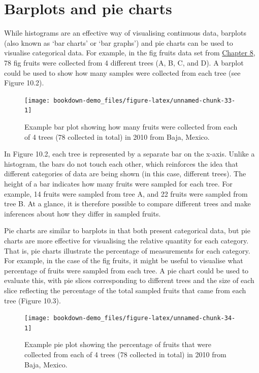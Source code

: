 \documentclass[
  openany]{krantz}
\begin{document}
\hypertarget{barplots-and-pie-charts}{%
\section{Barplots and pie charts}\label{barplots-and-pie-charts}}

While histograms are an effective way of visualising continuous data, barplots (also known as `bar charts' or `bar graphs') and pie charts can be used to visualise categorical data.
For example, in the fig fruits data set from \protect\hyperlink{Chapter_8}{Chapter 8}, 78 fig fruits were collected from 4 different trees (A, B, C, and D).
A barplot could be used to show how many samples were collected from each tree (see Figure 10.2).

\begin{figure}
\texttt{[image: bookdown-demo\_files/figure-latex/unnamed-chunk-33-1]} \caption{Example bar plot showing how many fruits were collected from each of 4 trees (78 collected in total) in 2010 from Baja, Mexico.}\label{fig:unnamed-chunk-33}
\end{figure}

In Figure 10.2, each tree is represented by a separate bar on the x-axis.
Unlike a histogram, the bars do not touch each other, which reinforces the idea that different categories of data are being shown (in this case, different trees).
The height of a bar indicates how many fruits were sampled for each tree.
For example, 14 fruits were sampled from tree A, and 22 fruits were sampled from tree B.
At a glance, it is therefore possible to compare different trees and make inferences about how they differ in sampled fruits.

Pie charts are similar to barplots in that both present categorical data, but pie charts are more effective for visualising the relative quantity for each category.
That is, pie charts illustrate the percentage of measurements for each category.
For example, in the case of the fig fruits, it might be useful to visualise what percentage of fruits were sampled from each tree.
A pie chart could be used to evaluate this, with pie slices corresponding to different trees and the size of each slice reflecting the percentage of the total sampled fruits that came from each tree (Figure 10.3).

\begin{figure}
\texttt{[image: bookdown-demo\_files/figure-latex/unnamed-chunk-34-1]} \caption{Example pie plot showing the percentage of fruits that were collected from each of 4 trees (78 collected in total) in 2010 from Baja, Mexico.}\label{fig:unnamed-chunk-34}
\end{figure}
\end{document}
